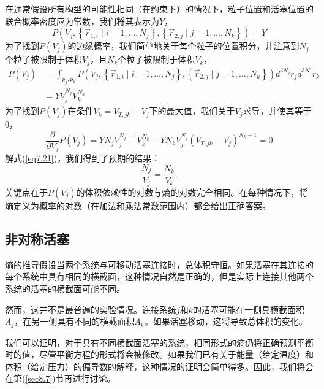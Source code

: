 \documentclass[UTF8]{ctexart}
\numberwithin{equation}{section}%
\numberwithin{figure}{section}%
\begin{document}
    在通常假设所有构型的可能性相同（在约束下）的情况下，粒子位置和活塞位置的联合概率密度应为常数，我们将其表示为$Y$，
    \begin{equation}
        P\left(V_{j},\left\{\vec{r}_{1, i} \mid i=1, \ldots, N_{j}\right\},\left\{\vec{r}_{2, j} \mid j=1, \ldots, N_{k}\right\}\right)=Y
        \end{equation}
    为了找到$P(V_j)$的边缘概率，我们简单地关于每个粒子的位置积分，并注意到$N_j$个粒子被限制于体积$V_j$，且$N_k$个粒子被限制于体积$V_k$，
        \begin{equation}
            \begin{aligned}
            P\left(V_{j}\right) &=\int_{p_{j}, p_{k}} P\left(V_{j},\left\{\vec{r}_{1, i} \mid i=1, \ldots, N_{j}\right\},\left\{\vec{r}_{2, j} \mid j=1, \ldots, N_{k}\right\}\right) d^{3 N_{j}} r_{j} d^{3 N_{j}} r_{k} \\
            &=Y V_{j}^{N_{j}} V_{k}^{N_{k}}
            \end{aligned}
            \end{equation}
    为了找到$P(V_j)$在条件$V_k=V_{T,jk}-V_j$下的最大值，我们关于$V_j$求导，并使其等于$0$，
    \begin{equation}\label{eq7.21}
        \frac{\partial}{\partial V_{j}} P\left(V_{j}\right)=Y N_{j} V_{j}^{N_{j}-1} V_{k}^{N_{k}}-Y N_{k} V_{j}^{N_{j}}\left(V_{T, j k}-V_{j}\right)^{N_{k}-1}=0
        \end{equation}
    解式(\ref{eq7.21})，我们得到了预期的结果：
    \begin{equation}
        \frac{N_{j}}{V_{j}}=\frac{N_{k}}{V_{k}} .
        \end{equation}
    关键点在于$P(V_j)$的体积依赖性的对数与熵的对数完全相同。在每种情况下，将熵定义为概率的对数（在加法和乘法常数范围内）都会给出正确答案。
    \subsection{非对称活塞}
    熵的推导假设当两个系统与可移动活塞连接时，总体积守恒。如果活塞在其连接的每个系统中具有相同的横截面，这种情况自然是正确的，但是实际上连接其他两个系统的活塞的横截面可能不同。
    
    然而，这并不是最普遍的实验情况。连接系统$j$和$k$的活塞可能在一侧具横截面积$A_j$，在另一侧具有不同的横截面积$A_k$。如果活塞移动，这将导致总体积的变化。

    我们可以证明，对于具有不同横截面活塞的系统，相同形式的熵仍将正确预测平衡时的值，尽管平衡方程的形式将会被修改。如果我们已有关于能量（给定温度）和体积（给定压力）的偏导数的解释，这种情况的证明会简单得多。因此，我们将会在第(\ref{sec8.7})节再进行讨论。
\end{document}
